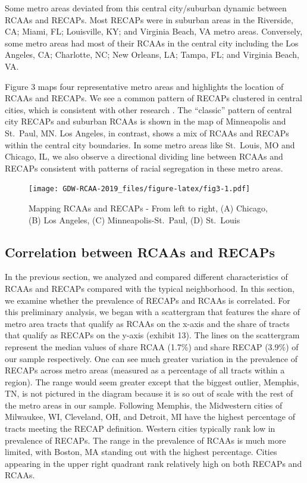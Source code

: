 \documentclass[11pt,]{article}
\begin{document}
Some metro areas deviated from this central city/suburban dynamic
between RCAAs and RECAPs. Most RECAPs were in suburban areas in the
Riverside, CA; Miami, FL; Louisville, KY; and Virginia Beach, VA metro
areas. Conversely, some metro areas had most of their RCAAs in the
central city including the Los Angeles, CA; Charlotte, NC; New Orleans,
LA; Tampa, FL; and Virginia Beach, VA.

Figure 3 maps four representative metro areas and highlights the
location of RCAAs and RECAPs. We see a common pattern of RECAPs
clustered in central cities, which is consistent with other research
\autocite{jargowsky1997poverty}. The ``classic'' pattern of central city
RECAPs and suburban RCAAs is shown in the map of Minneapolis and
St.~Paul, MN. Los Angeles, in contrast, shows a mix of RCAAs and RECAPs
within the central city boundaries. In some metro areas like St.~Louis,
MO and Chicago, IL, we also observe a directional dividing line between
RCAAs and RECAPs consistent with patterns of racial segregation in these
metro areas.

\begin{figure}
\centering
\texttt{[image: GDW-RCAA-2019\_files/figure-latex/fig3-1.pdf]}
\caption{Mapping RCAAs and RECAPs - From left to right, (A) Chicago, (B)
Los Angeles, (C) Minneapolis-St.~Paul, (D) St.~Louis}
\end{figure}

\hypertarget{correlation-between-rcaas-and-recaps}{%
\subsection{Correlation between RCAAs and
RECAPs}\label{correlation-between-rcaas-and-recaps}}

In the previous section, we analyzed and compared different
characteristics of RCAAs and RECAPs compared with the typical
neighborhood. In this section, we examine whether the prevalence of
RECAPs and RCAAs is correlated. For this preliminary analysis, we began
with a scattergram that features the share of metro area tracts that
qualify as RCAAs on the x-axis and the share of tracts that qualify as
RECAPs on the y-axis (exhibit 13). The lines on the scattergram
represent the median values of share RCAA (1.7\%) and share RECAP
(3.9\%) of our sample respectively. One can see much greater variation
in the prevalence of RECAPs across metro areas (measured as a percentage
of all tracts within a region). The range would seem greater except that
the biggest outlier, Memphis, TN, is not pictured in the diagram because
it is so out of scale with the rest of the metro areas in our sample.
Following Memphis, the Midwestern cities of Milwaukee, WI, Cleveland,
OH, and Detroit, MI have the highest percentage of tracts meeting the
RECAP definition. Western cities typically rank low in prevalence of
RECAPs. The range in the prevalence of RCAAs is much more limited, with
Boston, MA standing out with the highest percentage. Cities appearing in
the upper right quadrant rank relatively high on both RECAPs and RCAAs.
\end{document}
